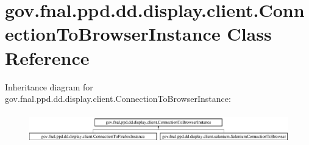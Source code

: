 \hypertarget{classgov_1_1fnal_1_1ppd_1_1dd_1_1display_1_1client_1_1ConnectionToBrowserInstance}{\section{gov.\-fnal.\-ppd.\-dd.\-display.\-client.\-Connection\-To\-Browser\-Instance Class Reference}
\label{classgov_1_1fnal_1_1ppd_1_1dd_1_1display_1_1client_1_1ConnectionToBrowserInstance}
}
Inheritance diagram for gov.\-fnal.\-ppd.\-dd.\-display.\-client.\-Connection\-To\-Browser\-Instance\-:\begin{figure}[H]
\begin{center}
\leavevmode
\includegraphics[height=1.333333cm]{classgov_1_1fnal_1_1ppd_1_1dd_1_1display_1_1client_1_1ConnectionToBrowserInstance}
\end{center}
\end{figure}

